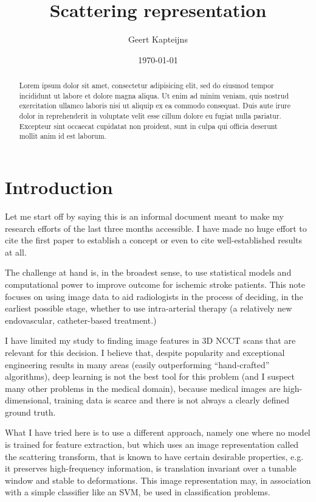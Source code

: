 \documentclass[twocolumn, openany, oneside, article]{memoir}
\title{Scattering representation}
\author{Geert Kapteijns}
\date{\today}
\begin{document}
\maketitle
\pagestyle{simple}

\begin{abstract}

Lorem ipsum dolor sit amet, consectetur adipisicing elit, sed do eiusmod
tempor incididunt ut labore et dolore magna aliqua. Ut enim ad minim veniam,
quis nostrud exercitation ullamco laboris nisi ut aliquip ex ea commodo
consequat. Duis aute irure dolor in reprehenderit in voluptate velit esse
cillum dolore eu fugiat nulla pariatur. Excepteur sint occaecat cupidatat non
proident, sunt in culpa qui officia deserunt mollit anim id est laborum.

\end{abstract}

\chapter{Introduction}

Let me start off by saying this is an informal document meant to make my
research efforts of the last three months accessible. I have made no huge effort
to cite the first paper to establish a concept or even to cite well-established
results at all.

The challenge at hand is, in the broadest sense, to use statistical models and computational power to improve outcome
for ischemic stroke patients. This note focuses on using image data to aid radiologists in the process of deciding, in
the earliest possible stage, whether to use intra-arterial therapy (a relatively new endovascular, catheter-based
treatment.)

I have limited my study to finding image features in 3D NCCT scans that are relevant for this decision. I believe that,
despite popularity and exceptional engineering results in many areas (easily outperforming \enquote{hand-crafted}
algorithms), deep learning is not the best tool for this problem (and I suspect many other problems in the medical
domain), because medical images are high-dimensional, training data is scarce and there is not always a clearly defined
ground truth.

What I have tried here is to use a different approach, namely one where no model is trained for feature extraction, but
which uses an image representation called the scattering transform, that is known to have certain desirable properties,
e.g. it preserves high-frequency information, is translation invariant over a tunable window and stable to deformations.
This image representation may, in association with a simple classifier like an SVM, be used in classification problems.
\end{document}
